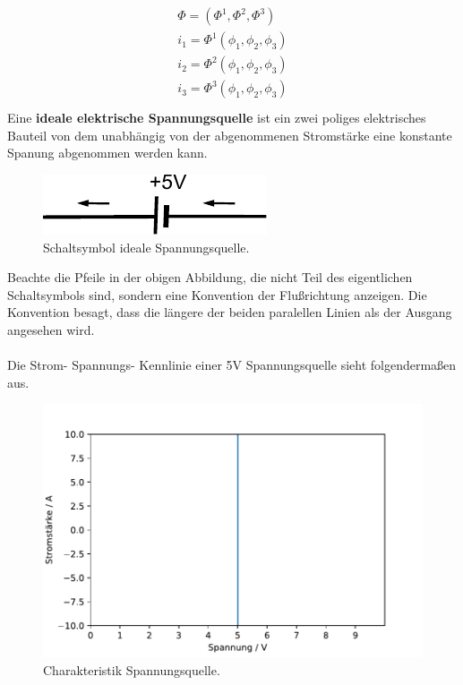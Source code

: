 \documentclass[11pt,a4paper,leqno]{report}
\numberwithin{equation}{chapter}
\begin{document}
\begin{align} 
\begin{split}
\Phi = (\Phi^1, \Phi^2, \Phi^3)\\
i_1 = \Phi^1(\phi_1,\phi_2,\phi_3)\\
i_2 = \Phi^2(\phi_1,\phi_2,\phi_3)\\
i_3 = \Phi^3(\phi_1,\phi_2,\phi_3)\\
\end{split}
\end{align}
\noindent
Eine \textbf{ideale elektrische Spannungsquelle} ist ein zwei poliges elektrisches Bauteil von dem unabh\"angig von der abgenommenen Stromst\"arke eine konstante Spanung abgenommen werden kann. 
\begin{figure}[H]
	\begin{center}
		\includegraphics[scale=1]{Bilder/ideal.pdf}
		\caption{Schaltsymbol ideale Spannungsquelle.}
	\end{center}
\end{figure}
\noindent
Beachte die Pfeile in der obigen Abbildung, die nicht Teil des eigentlichen Schaltsymbols sind, sondern eine Konvention der Flu\ss{}richtung anzeigen. Die Konvention besagt, dass die l\"angere der beiden paralellen Linien als der Ausgang angesehen wird.\\
\\
Die Strom- Spannungs- Kennlinie einer 5V Spannungsquelle sieht folgenderma\ss{}en aus.
\begin{figure}[H]
	\begin{center}
		\includegraphics[scale=0.5]{Bilder/ideal_spannung.pdf}
		\caption{Charakteristik Spannungsquelle.}
	\end{center}
\end{figure}
\end{document}
